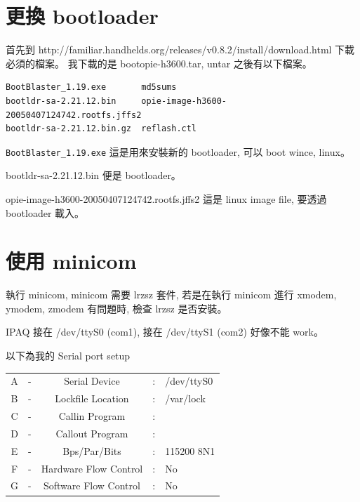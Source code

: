 \documentclass[12pt,a4paper]{article}
\begin{document}
\begin{CJK}{UTF8}{bsmi} %
\renewcommand{\contentsname}{目錄}
\renewcommand{\tablename}{表}
\renewcommand{\figurename}{圖}
\renewcommand{\listtablename}{表格目錄}
\renewcommand{\listfigurename}{圖目錄}





\newpage

\tableofcontents
\newpage


\section{更換 bootloader}
首先到
http://familiar.handhelds.org/releases/v0.8.2/install/download.html
下載必須的檔案。
我下載的是 bootopie-h3600.tar,
untar 之後有以下檔案。

\begin{verbatim}
BootBlaster_1.19.exe       md5sums
bootldr-sa-2.21.12.bin     opie-image-h3600-20050407124742.rootfs.jffs2
bootldr-sa-2.21.12.bin.gz  reflash.ctl
\end{verbatim}

\verb+BootBlaster_1.19.exe+ 這是用來安裝新的 bootloader,
可以 boot wince, linux。

bootldr-sa-2.21.12.bin 便是 bootloader。

opie-image-h3600-20050407124742.rootfs.jffs2 這是 linux image file,
要透過 bootloader 載入。

\section{使用 minicom}
執行 minicom, minicom 需要 lrzsz 套件,
若是在執行 minicom 進行 xmodem, ymodem, zmodem 有問題時,
檢查 lrzsz 是否安裝。

IPAQ 接在 /dev/ttyS0 (com1),
接在 /dev/ttyS1 (com2) 好像不能 work。

以下為我的 Serial port setup   

\begin{tabular}{ccccl}
A & - &   Serial Device &     : & /dev/ttyS0\\
B & - & Lockfile Location  &   : & /var/lock\\
C & - &  Callin Program    & : &  \\
D & - &  Callout Program   & : &  \\
E & - &  Bps/Par/Bits    &   : & 115200 8N1\\
F & - & Hardware Flow Control & : & No\\
G & - & Software Flow Control &:& No   \\
\end{tabular}


\end{CJK}
\end{document}
